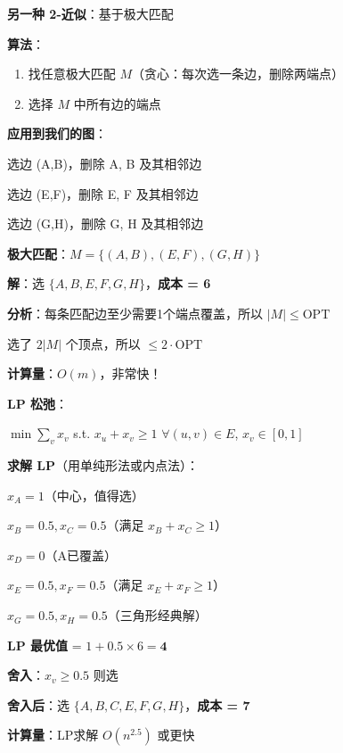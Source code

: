 \documentclass[12pt, a4paper]{ctexart}
\begin{document}
\begin{blackboard}[方法2：匹配算法（2-近似）]

\textbf{另一种 2-近似}：基于极大匹配

\textbf{算法}：
\begin{enumerate}
    \item 找任意极大匹配 $M$（贪心：每次选一条边，删除两端点）
    \item 选择 $M$ 中所有边的端点
\end{enumerate}

\textbf{应用到我们的图}：

选边 (A,B)，删除 A, B 及其相邻边

选边 (E,F)，删除 E, F 及其相邻边

选边 (G,H)，删除 G, H 及其相邻边

\textbf{极大匹配}：$M = \{(A,B), (E,F), (G,H)\}$

\textbf{解}：选 $\{A, B, E, F, G, H\}$，\textbf{成本 = 6}

\textbf{分析}：每条匹配边至少需要1个端点覆盖，所以 $|M| \leq \text{OPT}$

选了 $2|M|$ 个顶点，所以 $\leq 2 \cdot \text{OPT}$

\textbf{计算量}：$O(m)$，非常快！

\end{blackboard}

\begin{blackboard}[方法3：LP舍入（2-近似）]

\textbf{LP 松弛}：

$\min \sum_v x_v$ \quad s.t. \quad $x_u + x_v \geq 1$ $\forall (u,v) \in E$, \quad $x_v \in [0,1]$

\textbf{求解 LP}（用单纯形法或内点法）：

$x_A = 1$（中心，值得选）

$x_B = 0.5, x_C = 0.5$（满足 $x_B + x_C \geq 1$）

$x_D = 0$（A已覆盖）

$x_E = 0.5, x_F = 0.5$（满足 $x_E + x_F \geq 1$）

$x_G = 0.5, x_H = 0.5$（三角形经典解）

\textbf{LP 最优值} = $1 + 0.5 \times 6 = \mathbf{4}$

\textbf{舍入}：$x_v \geq 0.5$ 则选

\textbf{舍入后}：选 $\{A, B, C, E, F, G, H\}$，\textbf{成本 = 7}

\textbf{计算量}：LP求解 $O(n^{2.5})$ 或更快

\end{blackboard}
\end{document}
